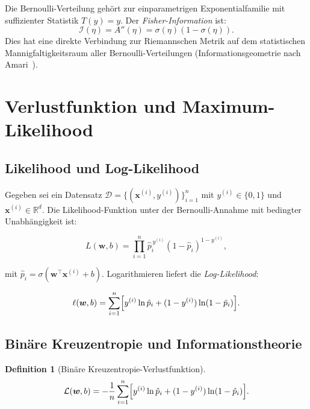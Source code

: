 ﻿\documentclass[12pt, a4paper]{article}
\theoremstyle{definition}
\newtheorem{definition}[theorem]{Definition}
\theoremstyle{remark}
\newcommand{\R}{\mathbb{R}}
\newcommand{\sigmoid}{\sigma}
\newcommand{\vw}{\bm{w}}
\newcommand{\vx}{\bm{x}}
\newcommand{\T}{\top}
\begin{document}
Die Bernoulli-Verteilung gehört zur einparametrigen Exponentialfamilie mit suffizienter
Statistik $T(y) = y$. Der \emph{Fisher-Information} ist:
\begin{equation}
  \mathcal{I}(\eta) = A''(\eta) = \sigmoid(\eta)(1-\sigmoid(\eta)).
\end{equation}
Dies hat eine direkte Verbindung zur Riemannschen Metrik auf dem statistischen Mannigfaltigkeitsraum
aller Bernoulli-Verteilungen (Informationsgeometrie nach Amari~\citep{amari2016information}).

\section{Verlustfunktion und Maximum-Likelihood}

\subsection{Likelihood und Log-Likelihood}

Gegeben sei ein Datensatz $\mathcal{D} = \{(\vx^{(i)}, y^{(i)})\}_{i=1}^n$ mit
$y^{(i)} \in \{0,1\}$ und $\vx^{(i)} \in \R^d$. Die Likelihood-Funktion unter der
Bernoulli-Annahme mit bedingter Unabhängigkeit ist:

\begin{equation}
  L(\vw, b) = \prod_{i=1}^{n} \hat{p}_i^{\,y^{(i)}} (1-\hat{p}_i)^{1-y^{(i)}},
  \label{eq:likelihood}
\end{equation}

mit $\hat{p}_i = \sigmoid(\vw^\T\vx^{(i)}+b)$. Logarithmieren liefert die \emph{Log-Likelihood}:

\begin{equation}
  \ell(\vw, b) = \sum_{i=1}^{n}\Bigl[ y^{(i)}\ln\hat{p}_i + (1-y^{(i)})\ln(1-\hat{p}_i) \Bigr].
  \label{eq:log_likelihood}
\end{equation}

\subsection{Binäre Kreuzentropie und Informationstheorie}

\begin{definition}[Binäre Kreuzentropie-Verlustfunktion]
  \begin{equation}
    \mathcal{L}(\vw, b) = -\frac{1}{n}\sum_{i=1}^{n}\Bigl[ y^{(i)}\ln\hat{p}_i + (1-y^{(i)})\ln(1-\hat{p}_i) \Bigr].
    \label{eq:bce_loss}
  \end{equation}
\end{definition}
\end{document}
